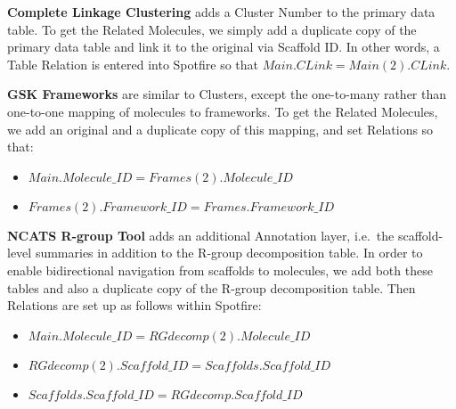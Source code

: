 \documentclass[journal=jacsat,manuscript=article]{achemso}
\newcommand*\ie{i.e.~}
\begin{document}
{\bf Complete Linkage Clustering} adds a Cluster Number to the primary data table. To get the Related Molecules, we simply add a duplicate copy of the primary data table and link it to the original via Scaffold ID. In other words, a Table Relation is entered into Spotfire so that $Main.CLink = Main(2).CLink$.  

{\bf GSK Frameworks} are similar to Clusters, except the one-to-many rather than one-to-one mapping of molecules to frameworks. To get the Related Molecules, we add an original and a duplicate copy of this mapping, and set Relations so that:  
\begin{itemize}
\item $Main.Molecule\_ID = Frames(2).Molecule\_ID$
\item $Frames(2).Framework\_ID = Frames.Framework\_ID$
\end{itemize}

{\bf NCATS R-group Tool} adds an additional Annotation layer, \ie the scaffold-level summaries in addition to the R-group decomposition table. In order to enable bidirectional navigation from scaffolds to molecules, we add both these tables and also a duplicate copy of the R-group decomposition table. Then Relations are set up as follows within Spotfire:
\begin{itemize}
\item $Main.Molecule\_ID = RGdecomp(2).Molecule\_ID$
\item $RGdecomp(2).Scaffold\_ID = Scaffolds.Scaffold\_ID$
\item $Scaffolds.Scaffold\_ID = RGdecomp.Scaffold\_ID$
\end{itemize}   
\end{document}
